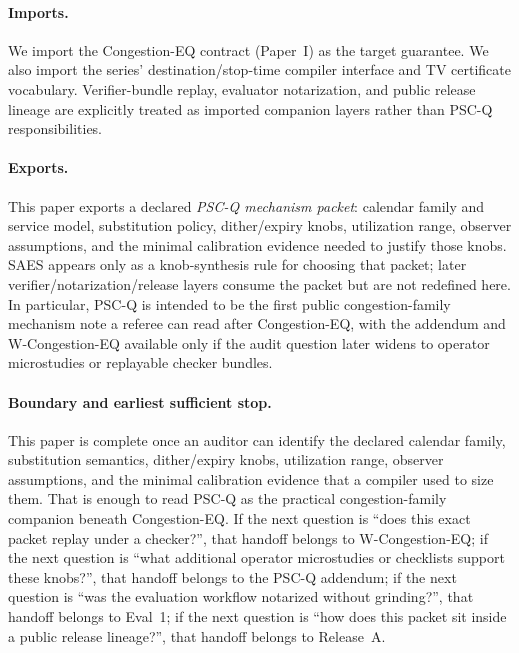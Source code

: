 \documentclass[11pt]{article}
\theoremstyle{definition}
\theoremstyle{remark}
\begin{document}
\paragraph{Imports.}
We import the Congestion-EQ contract (Paper~I) as the target guarantee.\cite{series:congeq}
We also import the series' destination/stop-time compiler interface and TV certificate vocabulary.\cite{series:schedcompiler,series:knapsacktransport}
Verifier-bundle replay, evaluator notarization, and public release lineage are explicitly treated as imported companion layers rather than PSC-Q responsibilities.\cite{series:wcongeq,series:evalnotary,anondht_release_receipts}

\paragraph{Exports.}
This paper exports a declared \emph{PSC-Q mechanism packet}: calendar family and service model, substitution policy, dither/expiry knobs, utilization range, observer assumptions, and the minimal calibration evidence needed to justify those knobs.
SAES appears only as a knob-synthesis rule for choosing that packet; later verifier/notarization/release layers consume the packet but are not redefined here. In particular, PSC-Q is intended to be the first public congestion-family mechanism note a referee can read after Congestion-EQ, with the addendum and W-Congestion-EQ available only if the audit question later widens to operator microstudies or replayable checker bundles.

\paragraph{Boundary and earliest sufficient stop.}
This paper is complete once an auditor can identify the declared calendar family, substitution semantics, dither/expiry knobs, utilization range, observer assumptions, and the minimal calibration evidence that a compiler used to size them.
That is enough to read PSC-Q as the practical congestion-family companion beneath Congestion-EQ. If the next question is ``does this exact packet replay under a checker?'', that handoff belongs to W-Congestion-EQ; if the next question is ``what additional operator microstudies or checklists support these knobs?'', that handoff belongs to the PSC-Q addendum; if the next question is ``was the evaluation workflow notarized without grinding?'', that handoff belongs to Eval~1; if the next question is ``how does this packet sit inside a public release lineage?'', that handoff belongs to Release~A.\cite{series:pscqaddendum,series:wcongeq,series:evalnotary,anondht_release_receipts}
\end{document}
